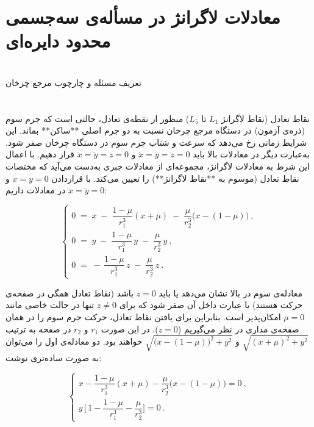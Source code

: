 \section{معادلات لاگرانژ در مسأله‌ی سه‌جسمی محدود دایره‌ای} 

\section{} تعریف مسئله و چارچوب مرجع چرخان  


\section{} نقاط تعادل (نقاط لاگرانژ $L_1$ تا $L_5$)  
منظور از نقطه‌ی تعادل، حالتی است که جرم سوم (ذره‌ی آزمون) در دستگاه مرجع چرخان نسبت به دو جرم اصلی **ساکن** بماند. این شرایط زمانی رخ می‌دهد که سرعت و شتاب جرم سوم در دستگاه چرخان صفر شود. به‌عبارت دیگر در معادلات بالا باید $\dot{x}=\dot{y}=\dot{z}=0$ و $\ddot{x}=\ddot{y}=\ddot{z}=0$ قرار دهیم. با اعمال این شرط به معادلات لاگرانژ، مجموعه‌ای از معادلات جبری به‌دست می‌آید که مختصات نقاط تعادل (موسوم به **نقاط لاگرانژ**) را تعیین می‌کند. با قراردادن $\dot{x}=\dot{y}=0$ و $\ddot{x}=\ddot{y}=0$ در معادلات داریم:

$$ 
\begin{cases}
	\displaystyle 0 \;=\; x \;-\; \dfrac{1-\mu}{r_1^3}(x+\mu) \;-\; \dfrac{\mu}{r_2^3}\Big(x-(1-\mu)\Big)~,  \\[2ex]
	\displaystyle 0 \;=\; y \;-\; \dfrac{1-\mu}{r_1^3}\,y \;-\; \dfrac{\mu}{r_2^3}\,y~,  \\[1ex]
	0 \;=\; -\,\dfrac{1-\mu}{r_1^3}\,z \;-\; \dfrac{\mu}{r_2^3}\,z~. 
\end{cases}
$$

معادله‌ی سوم در بالا نشان می‌دهد یا باید $z=0$ باشد (نقاط تعادل همگی در صفحه‌ی حرکت هستند) یا عبارت داخل آن صفر شود که برای $z\neq0$ تنها در حالت خاصی مانند $\mu=0$ امکان‌پذیر است. بنابراین برای یافتن نقاط تعادل، حرکت جرم سوم را در همان صفحه‌ی مداری در نظر می‌گیریم ($z=0$). در این صورت $r_1$ و $r_2$ در صفحه به ترتیب $\sqrt{(x+\mu)^2+y^2}$ و $\sqrt{\big(x-(1-\mu)\big)^2+y^2}$ خواهند بود. دو معادله‌ی اول را می‌توان به صورت ساده‌تری نوشت:

$$ 
\begin{cases}
	\displaystyle x - \dfrac{1-\mu}{r_1^3}(x+\mu) - \dfrac{\mu}{r_2^3}\Big(x-(1-\mu)\Big) = 0~,  \\[2ex]
	\displaystyle y\,\Big[\,1 - \dfrac{1-\mu}{r_1^3} - \dfrac{\mu}{r_2^3}\Big] = 0~. 
\end{cases}
$$


